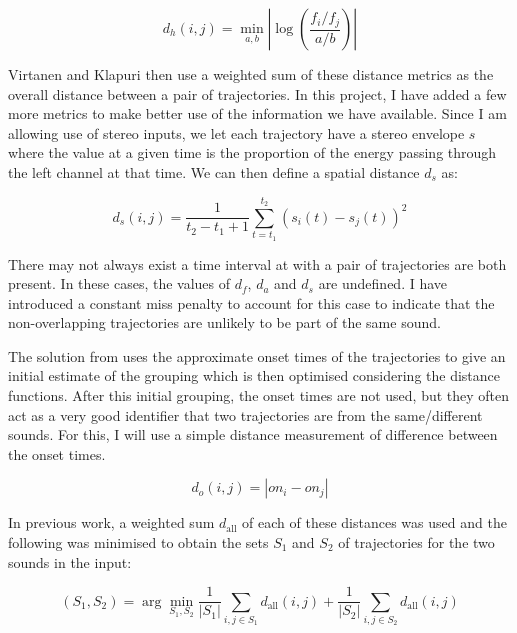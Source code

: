 \documentclass[10pt,twoside,a4paper]{report}
\begin{document}
\begin{equation}
d_h(i,j) = \min_{a, b} \left| \log \left( \frac{f_i/f_j}{a/b} \right) \right|
\end{equation}

Virtanen and Klapuri then use a weighted sum of these distance metrics as the overall distance between a pair of trajectories. In this project, I have added a few more metrics to make better use of the information we have available. Since I am allowing use of stereo inputs, we let each trajectory have a stereo envelope $ s $ where the value at a given time is the proportion of the energy passing through the left channel at that time. We can then define a spatial distance $ d_s $ as:

\begin{equation}
d_s(i,j) = \frac{1}{t_2 - t_1 + 1} \sum_{t = t_1}^{t_2} \left( s_i(t) - s_j(t) \right)^2
\end{equation}

There may not always exist a time interval at with a pair of trajectories are both present. In these cases, the values of $ d_f $, $ d_a $ and $ d_s $ are undefined. I have introduced a constant miss penalty to account for this case to indicate that the non-overlapping trajectories are unlikely to be part of the same sound.

The solution from \cite{virtanen2000separation} uses the approximate onset times of the trajectories to give an initial estimate of the grouping which is then optimised considering the distance functions. After this initial grouping, the onset times are not used, but they often act as a very good identifier that two trajectories are from the same/different sounds. For this, I will use a simple distance measurement of difference between the onset times.

\begin{equation}
d_o(i,j) = \left| \mathit{on}_i - \mathit{on}_j \right|
\end{equation}

In previous work, a weighted sum $ d_{\mathrm{all}} $ of each of these distances was used and the following was minimised to obtain the sets $ S_1 $ and $ S_2 $ of trajectories for the two sounds in the input:

\begin{equation}
(S_1, S_2) = \arg\min_{S_1, S_2} \frac{1}{|S_1|} \sum_{i, j \in S_1} d_{\mathrm{all}}(i,j) + \frac{1}{|S_2|} \sum_{i, j \in S_2} d_{\mathrm{all}}(i,j)
\end{equation}
\end{document}
